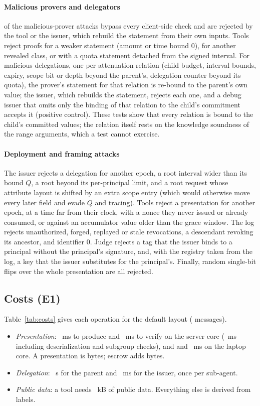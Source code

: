 \paragraph*{Malicious provers and delegators} \NAttMPReach{} of the \NAttMP{} malicious-prover attacks bypass every client-side check and are rejected by the tool or the issuer, which rebuild the statement from their own inputs. Tools reject proofs for a weaker statement (amount or time bound 0), for another revealed class, or with a quota statement detached from the signed interval. For \NAttMDel{} malicious delegations, one per attenuation relation (child budget, interval bounds, expiry, scope bit or depth beyond the parent's, delegation counter beyond its quota), the prover's statement for that relation is re-bound to the parent's own value; the issuer, which rebuilds the statement, rejects each one, and a debug issuer that omits only the binding of that relation to the child's commitment accepts it (positive control). These tests show that every relation is bound to the child's committed values; the relation itself rests on the knowledge soundness of the range arguments, which a test cannot exercise.

\paragraph*{Deployment and framing attacks} The issuer rejects a delegation for another epoch, a root interval wider than its bound $Q$, a root beyond its per-principal limit, and a root request whose attribute layout is shifted by an extra scope entry (which would otherwise move every later field and evade $Q$ and tracing). Tools reject a presentation for another epoch, at a time far from their clock, with a nonce they never issued or already consumed, or against an accumulator value older than the grace window. The log rejects unauthorized, forged, replayed or stale revocations, a descendant revoking its ancestor, and identifier 0. Judge rejects a tag that the issuer binds to a principal without the principal's signature, and, with the registry taken from the log, a key that the issuer substitutes for the principal's. Finally, \NBitFlips{} random single-bit flips over the whole presentation are all rejected.

\subsection{Costs (E1)}
Table~\ref{tab:costs} gives each operation for the default layout (\NMsgs{} messages).
\begin{itemize}
\item \emph{Presentation}: \PresMs{}~ms to produce and \VerMs{}~ms to verify on the server core (\VerBytesMs{}~ms including deserialization and subgroup checks), and \PresMacMs{} and \VerMacMs{}~ms on the laptop core. A presentation is \PresB{} bytes; escrow adds \EscExtraB{} bytes.
\item \emph{Delegation}: \DelParentS{}~s for the parent and \DelIssuerMs{}~ms for the issuer, once per sub-agent.
\item \emph{Public data}: a tool needs \PubParamsKB{}~kB of public data. Everything else is derived from labels.
\end{itemize}

